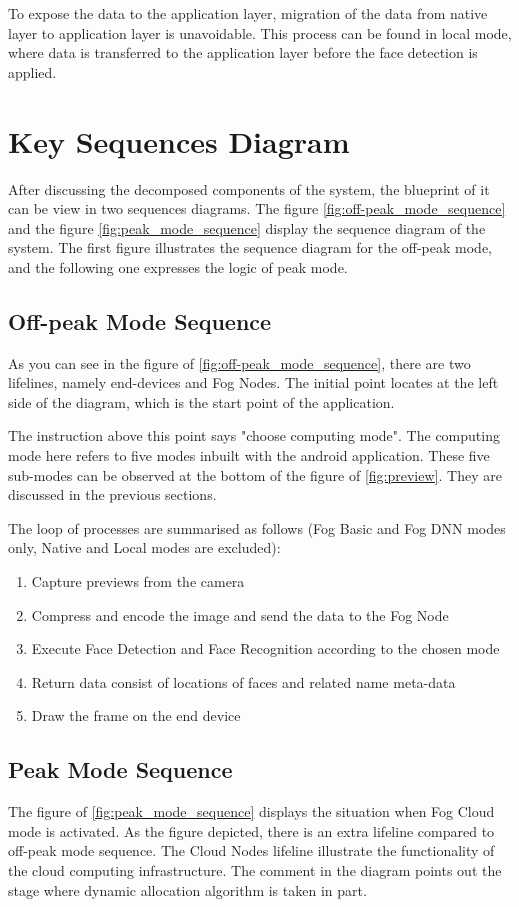 To expose the data to the application layer, migration of the data from native layer to application layer is unavoidable. This process can be found in local mode, where data is transferred to the application layer before the face detection is applied.

\section{Key Sequences Diagram}
After discussing the decomposed components of the system, the blueprint of it can be view in two sequences diagrams.
The figure \ref{fig:off-peak_mode_sequence} and the figure \ref{fig:peak_mode_sequence} display the sequence diagram of the system. The first figure illustrates the sequence diagram for the off-peak mode, and the following one expresses the logic of peak mode.

\subsection{Off-peak Mode Sequence}
As you can see in the figure of \ref{fig:off-peak_mode_sequence}, there are two lifelines, namely end-devices and Fog Nodes. The initial point locates at the left side of the diagram, which is the start point of the application.

The instruction above this point says "choose computing mode". The computing mode here refers to five modes inbuilt with the android application. These five sub-modes can be observed at the bottom of the figure of \ref{fig:preview}. They are discussed in the previous sections.

The loop of processes are summarised as follows (Fog Basic and Fog DNN modes only, Native and Local modes are excluded):
\begin{enumerate}
    \item Capture previews from the camera
    \item Compress and encode the image and send the data to the Fog Node
    \item Execute Face Detection and Face Recognition according to the chosen mode
    \item Return data consist of locations of faces and related name meta-data
    \item Draw the frame on the end device
\end{enumerate}

\subsection{Peak Mode Sequence}
The figure of \ref{fig:peak_mode_sequence} displays the situation when Fog Cloud mode is activated. As the figure depicted, there is an extra lifeline compared to off-peak mode sequence. The Cloud Nodes lifeline illustrate the functionality of the cloud computing infrastructure. The comment in the diagram points out the stage where dynamic allocation algorithm is taken in part.

